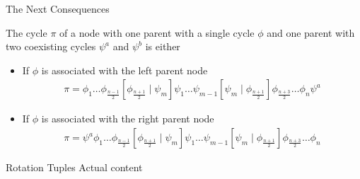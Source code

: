 \begin{frame}{The Next Consequences}
	\vspace{-1em}
	\begin{theorem}
		The cycle $\pi$ of a node with one parent with a single cycle $\phi$ and one parent with two coexisting cycles $\psi^a$ and $\psi^b$ is either
		\begin{itemize}
			\item If $\phi$ is associated with the left parent node
			      \begin{align*}
				      \pi = \phi_1 \dots \phi_{\frac{n-1}{2}} \left[\phi_{\frac{n+1}{2}} \mid \psi_m\right] \psi_1 \dots \psi_{m-1} \left[\psi_m \mid \phi_{\frac{n+1}{2}}\right] \phi_{\frac{n+3}{2}} \dots \phi_n \psi^a
			      \end{align*}
			\item If $\phi$ is associated with the right parent node
			      \begin{align*}
				      \pi = \psi^a \phi_1 \dots \phi_{\frac{n-1}{2}} \left[\phi_{\frac{n+1}{2}} \mid \psi_m\right] \psi_1 \dots \psi_{m-1} \left[\psi_m \mid \phi_{\frac{n+1}{2}}\right] \phi_{\frac{n+3}{2}} \dots \phi_n
			      \end{align*}
		\end{itemize}
	\end{theorem}
\end{frame}

\begin{frame}{Rotation Tuples}
	Actual content
\end{frame}